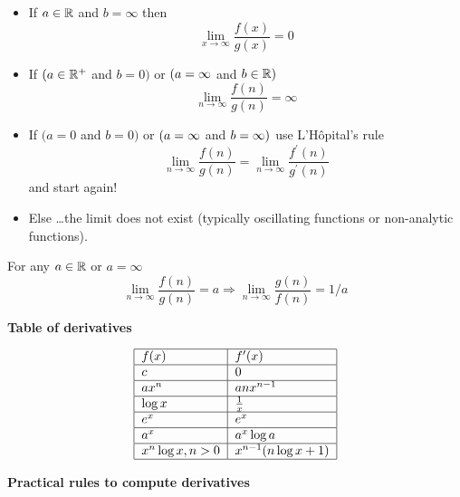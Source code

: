 \documentclass[justified,sixbynine]{tufte-book}
\def\subsubsection#1{{\bf #1}}
\theoremstyle{plain}%
\theoremstyle{definition}
\theoremstyle{remark}
\begin{document}
\begin{fullwidth}
\begin{itemize}
\item  If $a\in {\Bbb R}$ and $b=\infty $ then
\begin{equation}
\lim_{x\rightarrow \infty }\frac{f(x)}{g(x)}=0
\end{equation}

\item  If $(a\in {\Bbb R}^{+}$ and $b=0)$ or $(a={\Bbb \infty }$ and $b\in
{\Bbb R})$
\begin{equation}
\lim_{n\rightarrow \infty }\frac{f(n)}{g(n)}=\infty
\end{equation}

\item  If $(a=0$ and $b=0)$ or $(a={\Bbb \infty }$ and $b={\Bbb \infty })$
use L'H\^{o}pital's rule
\begin{equation}
\lim_{n\rightarrow \infty }\frac{f(n)}{g(n)}=\lim_{n\rightarrow \infty }%
\frac{f^{\prime }(n)}{g^{\prime }(n)}
\end{equation}
and start again!

\item  Else \dots the limit does not exist (typically oscillating functions or
non-analytic functions).
\end{itemize}

For any $a\in {\Bbb R}$ or $a=\infty $%
\begin{equation}
\lim_{n\rightarrow \infty }\frac{f(n)}{g(n)}=a\Rightarrow \lim_{n\rightarrow
\infty }\frac{g(n)}{f(n)}=1/a
\end{equation}

\subsubsection{Table of derivatives}

\begin{equation}
\begin{tabular}{|l|l|}
\hline
$f(x)$ & $f^{\prime }(x)$ \\ \hline
$c$ & $0$ \\ \hline
$ax^n$ & $anx^{n-1}$ \\ \hline
$\log x$ & $\frac 1x$ \\ \hline
$e^x$ & $e^x$ \\ \hline
$a^x$ & $a^x\log a$ \\ \hline
$x^n\log x,n>0$ & $x^{n-1}(n\log x+1)$ \\ \hline
\end{tabular}
\end{equation}

\subsubsection{Practical rules to compute derivatives}


\end{fullwidth}
\end{document}
